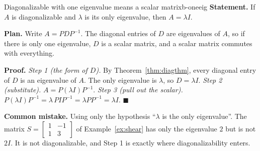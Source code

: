 \documentclass[11pt]{article}
\begin{document}
\begin{exmp}{Diagonalizable with one eigenvalue means a scalar matrix}{b-oneeig}
\textbf{Statement.} If $A$ is diagonalizable and $\lambda$ is its only eigenvalue, then $A=\lambda I$.

\textbf{Plan.} Write $A=PDP^{-1}$. The diagonal entries of $D$ are eigenvalues of $A$, so if there is only one eigenvalue, $D$ is a scalar matrix, and a scalar matrix commutes with everything.

\textbf{Proof.}
\emph{Step 1 (the form of $D$).} By Theorem~\ref{thm:diagthm}, every diagonal entry of $D$ is an eigenvalue of $A$. The only eigenvalue is $\lambda$, so $D=\lambda I$.
\emph{Step 2 (substitute).} $A=P(\lambda I)P^{-1}$.
\emph{Step 3 (pull out the scalar).} $P(\lambda I)P^{-1}=\lambda\,PIP^{-1}=\lambda PP^{-1}=\lambda I$. \qquad$\blacksquare$

\textbf{Common mistake.} Using only the hypothesis ``$\lambda$ is the only eigenvalue''. The matrix $S=\begin{bmatrix}1&-1\\1&3\end{bmatrix}$ of Example~\ref{ex:shear} has only the eigenvalue $2$ but is not $2I$. It is not diagonalizable, and Step 1 is exactly where diagonalizability enters.
\end{exmp}
\end{document}
